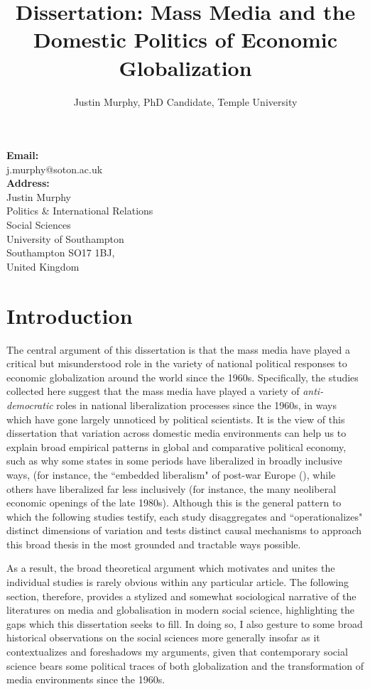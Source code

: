 \documentclass[12pt]{report}
\begin{document}
\title{Dissertation: Mass Media and the Domestic Politics of Economic Globalization}
\author{Justin Murphy, PhD Candidate, Temple University}



\maketitle


\textbf{Email:} \\
j.murphy@soton.ac.uk \\
\textbf{Address:} \\
Justin Murphy \\
Politics \& International Relations \\
Social Sciences \\
University of Southampton \\
Southampton SO17 1BJ, \\
United Kingdom

\chapter{Introduction}

The central argument of this dissertation is that the mass media have
played a critical but misunderstood role in the variety of national
political responses to economic globalization around the world since
the 1960s. Specifically, the studies collected here suggest that the
mass media have played a variety of \emph{anti-democratic} roles in
national liberalization processes since the 1960s, in ways which have
gone largely unnoticed by political scientists. It is the view of
this dissertation that variation across domestic media environments
can help us to explain broad empirical patterns in global and comparative
political economy, such as why some states in some periods have liberalized
in broadly inclusive ways, (for instance, the ``embedded
liberalism" of post-war Europe (\citealt{Ruggie:1982wx}),
while others have liberalized far less inclusively (for instance,
the many neoliberal economic openings of the late 1980s). Although
this is the general pattern to which the following studies testify,
each study disaggregates and ``operationalizes"
distinct dimensions of variation and tests distinct causal mechanisms
to approach this broad thesis in the most grounded and tractable ways
possible.

As a result, the broad theoretical argument which motivates and unites
the individual studies is rarely obvious within any particular article.
The following section, therefore, provides a stylized and somewhat
sociological narrative of the literatures on media and globalisation
in modern social science, highlighting the gaps which this dissertation
seeks to fill. In doing so, I also gesture to some broad historical
observations on the social sciences more generally insofar as it contextualizes
and foreshadows my arguments, given that contemporary social science
bears some political traces of both globalization and the transformation
of media environments since the 1960s.
\end{document}
